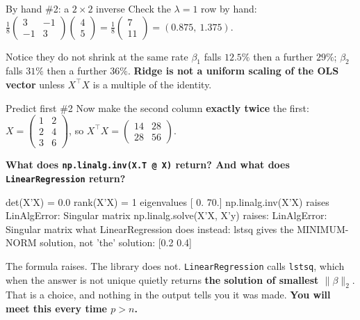 \documentclass[aspectratio=169]{beamer}
\begin{document}
\begin{frame}[shrink=8]{By hand \#2: a $2\times2$ inverse}
  \vspace{0.1em}
  Check the $\lambda=1$ row by hand:
  $\frac{1}{8}\left(\begin{smallmatrix}3&-1\\-1&3\end{smallmatrix}\right)
  \left(\begin{smallmatrix}4\\5\end{smallmatrix}\right)
  = \frac{1}{8}\left(\begin{smallmatrix}7\\11\end{smallmatrix}\right)
  = (0.875,\ 1.375)$.
  \begin{block}{Notice they do not shrink at the same rate}
    \small $\beta_1$ falls $12.5\%$ then a further $29\%$; $\beta_2$ falls
    $31\%$ then a further $36\%$. \textbf{Ridge is not a uniform scaling of
    the OLS vector} unless $X^{\!\top}\!X$ is a multiple of the identity.
  \end{block}
\end{frame}

\begin{frame}[fragile,shrink=8]{Predict first \#2}
Now make the second column \textbf{exactly twice} the first:
$X = \left(\begin{smallmatrix}1&2\\2&4\\3&6\end{smallmatrix}\right)$, so
$X^{\!\top}\!X = \left(\begin{smallmatrix}14&28\\28&56\end{smallmatrix}\right)$.

\begin{center}
  \textbf{What does \texttt{np.linalg.inv(X.T @ X)} return? And what does
  \texttt{LinearRegression} return?}
\end{center}
\vspace{0.2em}
\begin{outblk}
det(X'X) = 0.0     rank(X'X) = 1     eigenvalues [ 0. 70.]
np.linalg.inv(X'X) raises LinAlgError: Singular matrix
np.linalg.solve(X'X, X'y) raises: LinAlgError: Singular matrix
what LinearRegression does instead: lstsq gives the MINIMUM-NORM
  solution, not 'the' solution: [0.2 0.4]
\end{outblk}
\begin{alertblock}{The formula raises. The library does not.}
  \footnotesize \texttt{LinearRegression} calls \texttt{lstsq}, which when the
  answer is not unique quietly returns \textbf{the solution of smallest
  $\|\beta\|_2$}. That is a choice, and nothing in the output tells you it was
  made. \textbf{You will meet this every time $p > n$.}
\end{alertblock}
\end{frame}
\end{document}
